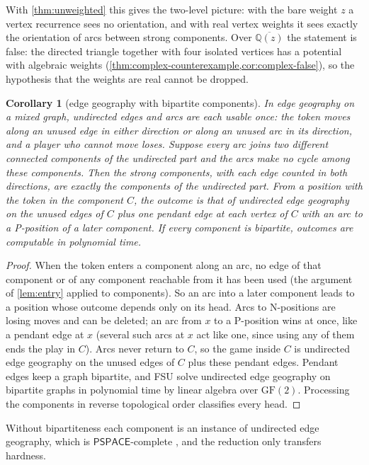 \documentclass[11pt]{amsart}
\theoremstyle{plain}
\newtheorem{corollary}[theorem]{Corollary}
\theoremstyle{definition}
\theoremstyle{remark}
\numberwithin{equation}{section}
\newcommand{\QQ}{\mathbb{Q}}
\newcommand{\Qzbar}{\overline{\QQ(z)}}
\newcommand{\cls}[1]{\mathsf{#1}}
\newcommand{\PSPACE}{\cls{PSPACE}}
\begin{document}
With \cref{thm:unweighted} this gives the two-level picture: with the bare weight $z$ a vertex recurrence sees no orientation, and with real vertex weights it sees exactly the orientation of arcs between strong components. Over $\Qzbar$ the statement is false: the directed triangle together with four isolated vertices has a potential with algebraic weights (\cref{thm:complex-counterexample,cor:complex-false}), so the hypothesis that the weights are real cannot be dropped.

\begin{corollary}[edge geography with bipartite components]\label{cor:edge-geo}
In edge geography on a mixed graph, undirected edges and arcs are each usable once: the token moves along an unused edge in either direction or along an unused arc in its direction, and a player who cannot move loses. Suppose every arc joins two different connected components of the undirected part and the arcs make no cycle among these components. Then the strong components, with each edge counted in both directions, are exactly the components of the undirected part. From a position with the token in the component $C$, the outcome is that of undirected edge geography on the unused edges of $C$ plus one pendant edge at each vertex of $C$ with an arc to a P-position of a later component. If every component is bipartite, outcomes are computable in polynomial time.
\end{corollary}
\begin{proof}
When the token enters a component along an arc, no edge of that component or of any component reachable from it has been used (the argument of \cref{lem:entry} applied to components). So an arc into a later component leads to a position whose outcome depends only on its head. Arcs to N-positions are losing moves and can be deleted; an arc from $x$ to a P-position wins at once, like a pendant edge at $x$ (several such arcs at $x$ act like one, since using any of them ends the play in $C$). Arcs never return to $C$, so the game inside $C$ is undirected edge geography on the unused edges of $C$ plus these pendant edges. Pendant edges keep a graph bipartite, and FSU \cite{FSU} solve undirected edge geography on bipartite graphs in polynomial time by linear algebra over $\mathrm{GF}(2)$. Processing the components in reverse topological order classifies every head.
\end{proof}

Without bipartiteness each component is an instance of undirected edge geography, which is $\PSPACE$-complete \cite{FSU}, and the reduction only transfers hardness.
\end{document}
